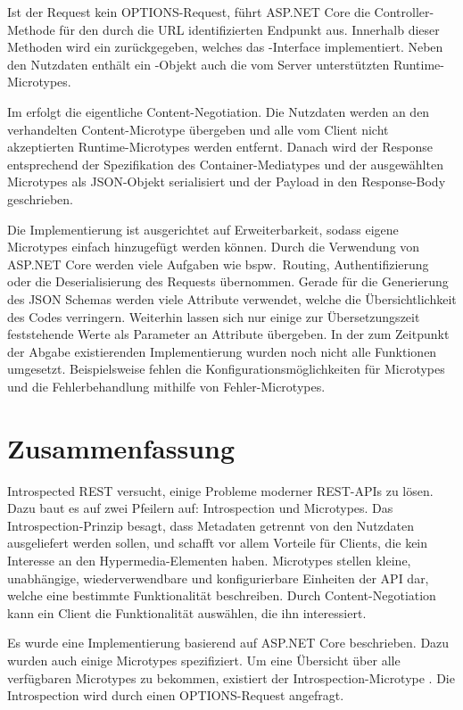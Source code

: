 Ist der Request kein OPTIONS-Request, führt ASP.NET Core die Controller-Methode für den durch die URL identifizierten Endpunkt aus. Innerhalb dieser Methoden wird ein  zurückgegeben, welches das -Interface implementiert. Neben den Nutzdaten enthält ein -Objekt auch die vom Server unterstützten Runtime-Microtypes.

Im  erfolgt die eigentliche Content-Negotiation. Die Nutzdaten werden an den verhandelten Content-Microtype übergeben und alle vom Client nicht akzeptierten Runtime-Microtypes werden entfernt. Danach wird der Response entsprechend der Spezifikation des Container-Mediatypes und der ausgewählten Microtypes als JSON-Objekt serialisiert und der Payload in den Response-Body geschrieben.

\para{}Die Implementierung ist ausgerichtet auf Erweiterbarkeit, sodass eigene Microtypes einfach hinzugefügt werden können. Durch die Verwendung von ASP.NET Core werden viele Aufgaben wie bspw.\ Routing, Authentifizierung oder die Deserialisierung des Requests übernommen. Gerade für die Generierung des JSON Schemas werden viele Attribute verwendet, welche die Übersichtlichkeit des Codes verringern. Weiterhin lassen sich nur einige zur Übersetzungszeit feststehende Werte als Parameter an Attribute übergeben. \autocite[Abs.~22.2]{CSharp} In der zum Zeitpunkt der Abgabe existierenden Implementierung wurden noch nicht alle Funktionen umgesetzt. Beispielsweise fehlen die Konfigurationsmöglichkeiten für Microtypes und die Fehlerbehandlung mithilfe von Fehler-Microtypes.

\section{Zusammenfassung}

Introspected REST versucht, einige Probleme moderner REST-APIs zu lösen. Dazu baut es auf zwei Pfeilern auf: Introspection und Microtypes. Das Introspection-Prinzip besagt, dass Metadaten getrennt von den Nutzdaten ausgeliefert werden sollen, und schafft vor allem Vorteile für Clients, die kein Interesse an den Hypermedia-Elementen haben. Microtypes stellen kleine, unabhängige, wiederverwendbare und konfigurierbare Einheiten der API dar, welche eine bestimmte Funktionalität beschreiben. Durch Content-Negotiation kann ein Client die Funktionalität auswählen, die ihn interessiert.

Es wurde eine Implementierung basierend auf ASP.NET Core beschrieben. Dazu wurden auch einige Microtypes spezifiziert. Um eine Übersicht über alle verfügbaren Microtypes zu bekommen, existiert der Introspection-Microtype . Die Introspection wird durch einen OPTIONS-Request angefragt.